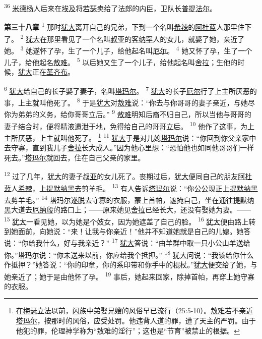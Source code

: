 \textsuperscript{36}
\uline{米德杨}人后来在\uline{埃及}将\uline{若瑟}卖给了法郎的内臣，卫队长\uline{普提法尔}。

\textbf{第三十八章\quad}
\textsuperscript{1}
那时\uline{犹大}离开自己的兄弟，下到一个名叫\uline{希辣}的\uline{阿杜蓝}人那里住下了。
\textsuperscript{2}
\uline{犹大}在那里看见了一个名叫\uline{叔亚}的\uline{客纳罕}人的女儿，就娶了她，亲近了她。
\textsuperscript{3}
她遂怀了孕，生了一个儿子，给他起名叫\uline{厄尔}。
\textsuperscript{4}
她又怀了孕，生了一个儿子，给他起名\uline{敖难}。
\textsuperscript{5}
以后她又生了一个儿子，给他起名叫\uline{舍拉}；生他的时候，\uline{犹大}正在\uline{革齐布}。

\textsuperscript{6}
\uline{犹大}给自己的长子娶了妻子，名叫\uline{塔玛尔}。
\textsuperscript{7}
\uline{犹大}的长子\uline{厄尔}行了上主所厌恶的事，上主就叫他死了。
\textsuperscript{8}
于是\uline{犹大}对\uline{敖难}说：“你去与你哥哥的妻子亲近，与她尽你为弟弟的义务，给你哥哥立后。”
\textsuperscript{9}
\uline{敖难}明知后裔不归自己，所以当他与哥哥的妻子结合时，便将精液遗泄于地，免得给自己的哥哥立后。
\textsuperscript{10}
他作了这事，为上主所厌恶，上主就叫他死了。
\footnote{在\uline{梅瑟}立法以前，\uline{闪}族中弟娶兄嫂的风俗早已流行（25:5-10）。\uline{敖难}若不亲近\uline{塔玛尔}，按那时的风俗，应受处罚。他违背人道的罪，遭了天主的严罚。由于他犯的罪，伦理神学称为“敖难的淫行”；这也是“节育”被禁止的根据。}
\textsuperscript{11}
\uline{犹大}于是对儿媳\uline{塔玛尔}说：“你回到你父亲家中去守寡，直到我儿子\uline{舍拉}长大成人。”因为他心里想：“恐怕他也如同他哥哥们一样死去。”\uline{塔玛尔}就回去，住在自己父亲的家里。

\textsuperscript{12}
过了几年，\uline{犹大}的妻子\uline{叔亚}的女儿死了。丧期过后，\uline{犹大}便同自己的朋友\uline{阿杜蓝}人\uline{希辣}，上\uline{提默}\uline{纳黑}去剪羊毛。
\textsuperscript{13}
有人告诉\uline{塔玛尔}说：“你公公现正上\uline{提默}\uline{纳黑}去剪羊毛。”
\textsuperscript{14}
\uline{塔玛尔}遂脱去守寡的衣服，蒙上首帕，遮掩自己，坐在通往\uline{提默}\uline{纳黑}大道去\uline{厄纳殷}的路口上；——原来她见\uline{舍拉}已经长大，还没有娶她为妻。——
\textsuperscript{15}
\uline{犹大}一看见她，以为她是个妓女，因为她遮盖了自己的脸。
\textsuperscript{16}
\uline{犹大}便由路上转到她面前，向她说：“来！让我与你亲近！”他并不知道她就是自己的儿媳。她答说：“你给我什么，好与我亲近？”
\textsuperscript{17}
\uline{犹大}答说：“由羊群中取一只小公山羊送给你。”\uline{塔玛尔}说：“你未送来以前，你应给我个抵押。”
\textsuperscript{18}
\uline{犹大}问说：“我该给你什么作抵押？”她答说：“你的印章，你的系印带和你手中的棍杖。”\uline{犹大}便交给了她，与她亲近了；她于是由他怀了孕。
\textsuperscript{19}
事后，她起来回家，除掉首帕，再穿上她守寡的衣服。

